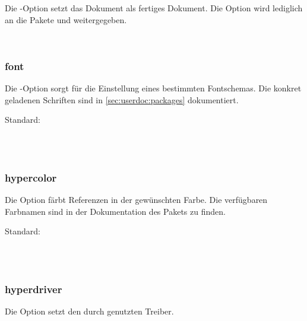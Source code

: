 Die -Option setzt das Dokument als fertiges Dokument.
Die Option wird lediglich an die Pakete  und  weitergegeben.

\begin{nutzung}
		\>\\
\end{nutzung}

\subsubsection{font}

Die -Option sorgt für die Einstellung eines bestimmten Fontschemas.
Die konkret geladenen Schriften sind in \autoref{sec:userdoc:packages} dokumentiert.

Standard: 

\begin{nutzung}
		\>\\
	\beispiel
		\>\\
		\>
\end{nutzung}

\subsubsection{hypercolor}

Die Option  färbt Referenzen in der gewünschten Farbe.
Die verfügbaren Farbnamen sind in der Dokumentation des Pakets  zu finden.

Standard: 

\begin{nutzung}
		\>\\
	\beispiel
		\>\\
		\>
\end{nutzung}

\subsubsection{hyperdriver}

Die Option  setzt den durch  genutzten Treiber.

